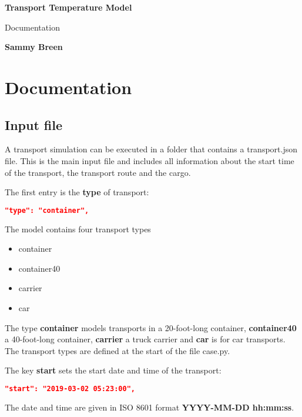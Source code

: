 \documentclass[%
FTMstudentthesis%
,optArial%
,optBiber%
,optEnglish%
,optCMYK%
]{FTMlatex}%
\def\ContinueLineNumber{\lstset{firstnumber=last}}
\begin{document}
%

\begin{titlepage}
	\begin{center}
		\vspace*{2cm}
		\raggedright
		{\Huge\textbf{Transport Temperature Model}}

		\vspace{0.5cm}
		{\Large Documentation}
			 
		\vspace{1.5cm}
 
		\textbf{Sammy Breen}
			 
	\end{center}
\end{titlepage}

\FTMPrintTableOfContents%


\FTMMainText%
\chapter{Documentation}
\section{Input file}%
%
A transport simulation can be executed in a folder that contains a transport.json file. This is the main input file and includes all information about the start time of the transport, the transport route and the cargo.%

The first entry is the \textbf{type} of transport:%
%
\begin{code}
\begin{lstlisting}[language=json]
"type": "container",
\end{lstlisting}
\end{code} 
%
The model contains four transport types%
\begin{itemize}%
	\item container%
	\item container40%
	\item carrier%
	\item car%
\end{itemize}%
%
The type \textbf{container} models transports in a 20-foot-long container, \textbf{container40} a 40-foot-long container, \textbf{carrier} a truck carrier and \textbf{car} is for car transports. The transport types are defined at the start of the file case.py.%

The key \textbf{start} sets the start date and time of the transport:
\begin{code}
\ContinueLineNumber
\begin{lstlisting}[language=json]
"start": "2019-03-02 05:23:00",
\end{lstlisting}
\end{code} 
%
The date and time are given in ISO 8601 format \textbf{YYYY-MM-DD hh:mm:ss}.%
\end{document}
